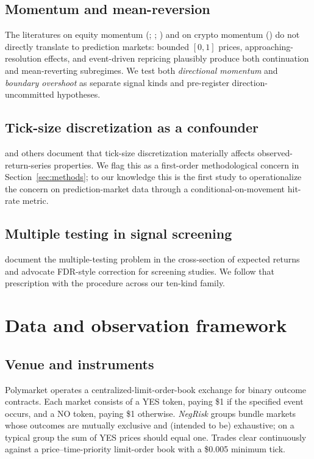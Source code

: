 \documentclass[review,12pt,authoryear]{elsarticle}
\begin{document}
\subsection{Momentum and mean-reversion}

The literatures on equity momentum (\citealp{JegadeeshTitman1993};
\citealp{Asness1994}; \citealp{MoskowitzOoiPedersen2012}) and on crypto
momentum (\citealp{LiuTsyvinski2021}) do not directly translate to
prediction markets: bounded \([0,1]\) prices, approaching-resolution
effects, and event-driven repricing plausibly produce both continuation and
mean-reverting subregimes. We test both \emph{directional momentum} and
\emph{boundary overshoot} as separate signal kinds and pre-register
direction-uncommitted hypotheses.

\subsection{Tick-size discretization as a confounder}

\citet{HasbrouckSaar2013} and others document that tick-size discretization
materially affects observed-return-series properties. We flag this as a
first-order methodological concern in Section~\ref{sec:methods}; to our
knowledge this is the first study to operationalize the concern on
prediction-market data through a conditional-on-movement hit-rate metric.

\subsection{Multiple testing in signal screening}

\citet{HarveyLiuZhu2016} document the multiple-testing problem in the
cross-section of expected returns and advocate FDR-style correction for
screening studies. We follow that prescription with the
\citet{BenjaminiHochberg1995} procedure across our ten-kind family.

\section{Data and observation framework}
\label{sec:data}

\subsection{Venue and instruments}

Polymarket operates a centralized-limit-order-book exchange for binary
outcome contracts. Each market consists of a YES token, paying \$1 if the
specified event occurs, and a NO token, paying \$1 otherwise.
\emph{NegRisk} groups bundle markets whose outcomes are mutually exclusive
and (intended to be) exhaustive; on a typical group the sum of YES prices
should equal one. Trades clear continuously against a price--time-priority
limit-order book with a \$0.005 minimum tick.
\end{document}
